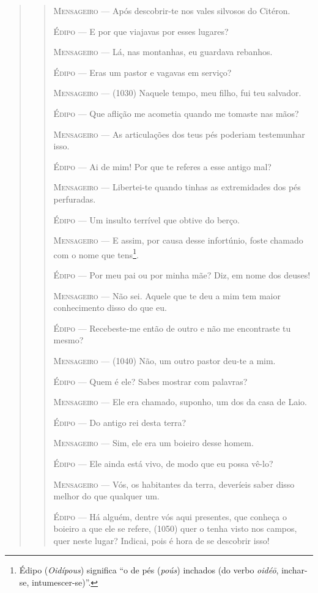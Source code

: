\begin{verse}
\begin{verse}
\textsc{Mensageiro} --- Após descobrir-te nos vales silvosos do Citéron.

\textsc{Édipo} --- E por que viajavas por esses lugares?

\textsc{Mensageiro} --- Lá, nas montanhas, eu guardava rebanhos.

\textsc{Édipo} --- Eras um pastor e vagavas em serviço?

\textsc{Mensageiro} --- (1030) Naquele tempo, meu filho, fui teu salvador.

\textsc{Édipo} --- Que aflição me acometia quando me tomaste nas mãos?

\textsc{Mensageiro} --- As articulações dos teus pés poderiam testemunhar isso.

\textsc{Édipo} --- Ai de mim! Por que te referes a esse antigo mal?

\textsc{Mensageiro} --- Libertei-te quando tinhas as extremidades dos pés perfuradas.

\textsc{Édipo} --- Um insulto terrível que obtive do berço.

\textsc{Mensageiro} --- E assim, por causa desse infortúnio, foste chamado com o nome que
tens\footnote{Édipo (\emph{Oidípous}) significa ``o de pés (\emph{poús})
  inchados (do verbo \emph{oidéō}, inchar-se, intumescer-se)''.}.

\textsc{Édipo} --- Por meu pai ou por minha mãe? Diz, em nome dos deuses!

\textsc{Mensageiro} --- Não sei. Aquele que te deu a mim tem maior conhecimento disso do que eu.

\textsc{Édipo} --- Recebeste-me então de outro e não me encontraste tu mesmo?

\textsc{Mensageiro} --- (1040) Não, um outro pastor deu-te a mim.

\textsc{Édipo} --- Quem é ele? Sabes mostrar com palavras?

\textsc{Mensageiro} --- Ele era chamado, suponho, um dos da casa de Laio.

\textsc{Édipo} --- Do antigo rei desta terra?

\textsc{Mensageiro} --- Sim, ele era um boieiro desse homem.

\textsc{Édipo} --- Ele ainda está vivo, de modo que eu possa vê-lo?

\textsc{Mensageiro} --- Vós, os habitantes da terra, deveríeis saber disso melhor do que
qualquer um.

\textsc{Édipo} --- Há alguém, dentre vós aqui presentes, que conheça o boieiro a que ele se
refere, (1050) quer o tenha visto nos campos, quer neste lugar? Indicai,
pois é hora de se descobrir isso!


\end{verse}
\end{verse}
